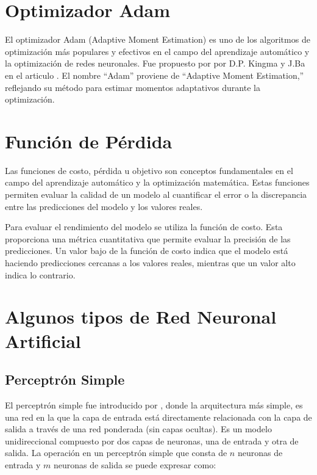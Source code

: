 \documentclass[
  us-letterpaper,
]{scrreprt}
\theoremstyle{plain}
\theoremstyle{definition}
\theoremstyle{definition}
\theoremstyle{remark}
\begin{document}
\section{Optimizador Adam}\label{sec-Adam}

El optimizador Adam (Adaptive Moment Estimation) es uno de los
algoritmos de optimización más populares y efectivos en el campo del
aprendizaje automático y la optimización de redes neuronales. Fue
propuesto por por D.P. Kingma y J.Ba en el articulo
\autocite{kingma2014adam}. El nombre ``Adam'' proviene de ``Adaptive
Moment Estimation,'' reflejando su método para estimar momentos
adaptativos durante la optimización.

\section{Función de Pérdida}\label{sec-funciuxf3n-de-perdida}

Las funciones de costo, pérdida u objetivo son conceptos fundamentales
en el campo del aprendizaje automático y la optimización matemática.
Estas funciones permiten evaluar la calidad de un modelo al cuantificar
el error o la discrepancia entre las predicciones del modelo y los
valores reales.

Para evaluar el rendimiento del modelo se utiliza la función de costo.
Esta proporciona una métrica cuantitativa que permite evaluar la
precisión de las predicciones. Un valor bajo de la función de costo
indica que el modelo está haciendo predicciones cercanas a los valores
reales, mientras que un valor alto indica lo contrario.

\section{Algunos tipos de Red Neuronal
Artificial}\label{algunos-tipos-de-red-neuronal-artificial}

\subsection{Perceptrón Simple}\label{perceptruxf3n-simple}

El perceptrón simple fue introducido por
\textcite{rosenblatt1958perceptron}, donde la arquitectura más simple,
es una red en la que la capa de entrada está directamente relacionada
con la capa de salida a través de una red ponderada (sin capas ocultas).
Es un modelo unidireccional compuesto por dos capas de neuronas, una de
entrada y otra de salida. La operación en un perceptrón simple que
consta de \(n\) neuronas de entrada y \(m\) neuronas de salida se puede
expresar como:
\end{document}
